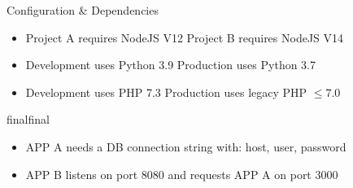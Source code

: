 \documentclass{beamer}
\def\final{final}
\def\status{final}
\begin{document}



\begin{frame}{}
  \vspace{-.6cm}
  \begin{center}
    \Large Configuration \& Dependencies
  \end{center}

  \begin{block}{}
    \begin{itemize}
      \small
      \setlength\itemsep{0em}
      \item Project A requires NodeJS V12 {\color{uos-red-full}\text{\marvosymLightning}} Project B requires NodeJS V14
      \item Development uses Python 3.9 {\color{uos-red-full}\text{\marvosymLightning}} Production uses Python 3.7
      \item Development uses PHP 7.3 {\color{uos-red-full}\text{\marvosymLightning}} Production uses legacy PHP \(\leq 7.0\)
    \end{itemize}
  \end{block}

  \ifx\status\final{}
    \pause{}
  \fi

  \begin{block}{}
    \begin{itemize}
      \small
      \setlength\itemsep{0em}
      \item APP A needs a DB connection string with: host, user, password
      \item APP B listens on port 8080 and requests APP A on port 3000
    \end{itemize}
  \end{block}
\end{frame}
\end{document}
